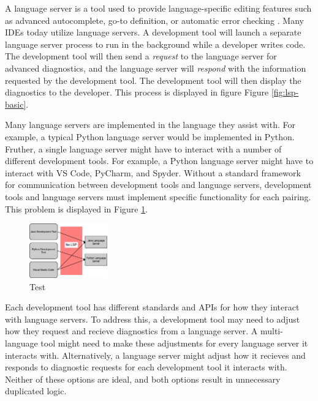 \documentclass{article}
\begin{document}
A language server is a tool used to provide language-specific editing features such as advanced autocomplete, go-to definition, or automatic error checking \cite{Microsoft_2022a}. Many IDEs today utilize language servers. A development tool will launch a separate language server process to run in the background while a developer writes code. The development tool will then send a \emph{request} to the language server for advanced diagnostics, and the language server will \emph{respond} with the information requested by the development tool. The development tool will then display the diagnostics to the developer. This process is displayed in figure Figure \ref{fig:lsp-basic}.

Many language servers are implemented in the language they assist with. For example, a typical Python language server would be implemented in Python. Fruther, a single language server might have to interact with a number of different development tools. For example, a Python language server might have to interact with VS Code, PyCharm, and Spyder. Without a standard framework for communication between development tools and language servers, development tools and language servers must implement specific functionality for each pairing. This problem is displayed in Figure \ref{fig:no-lsp-theory}. 

\begin{figure}
    \begin{center}
        \includegraphics[width=0.3\textwidth]{no-lsp-theory.png}
        \caption{Test}
    \end{center}
    \label{fig:no-lsp-theory}
\end{figure}

Each development tool has different standards and APIs for how they interact with language servers. To address this, a development tool may need to adjust how they request and recieve diagnostics from a language server. A multi-language tool might need to make these adjustments for every language server it interacts with. Alternatively, a language server might adjust how it recieves and responds to diagnostic requests for each development tool it interacts with. Neither of these options are ideal, and both options result in unnecessary duplicated logic.
\end{document}
